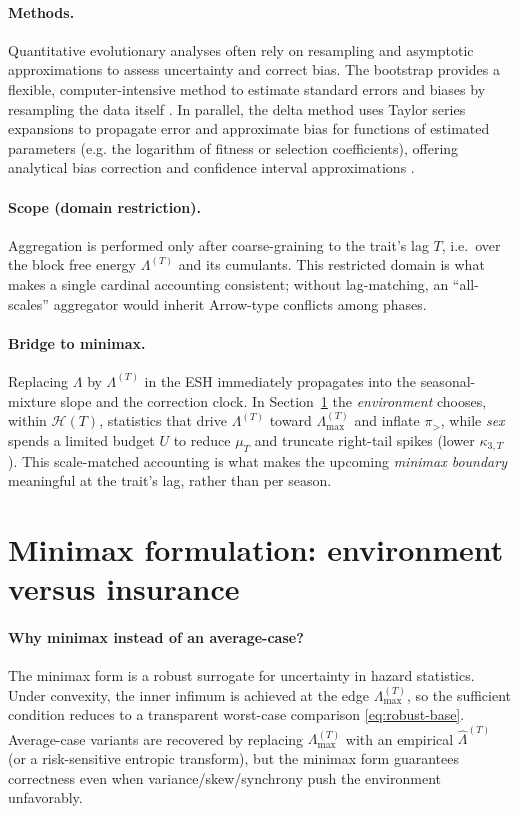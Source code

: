 \documentclass[11pt]{article}
\theoremstyle{upright}
\newcommand{\hazT}[1]{\Lambda^{(#1)}}          %
\newcommand{\hazmaxT}[1]{\Lambda^{(#1)}_{\max}}%
\begin{document}
\paragraph{Methods.}
Quantitative evolutionary analyses often rely on resampling and asymptotic approximations to assess uncertainty and correct bias. The bootstrap provides a flexible, computer-intensive method to estimate standard errors and biases by resampling the data itself \citep{Efron1979}. In parallel, the delta method uses Taylor series expansions to propagate error and approximate bias for functions of estimated parameters (e.g. the logarithm of fitness or selection coefficients), offering analytical bias correction and confidence interval approximations \citep{Casella2002}.

\paragraph{Scope (domain restriction).}
Aggregation is performed only after coarse-graining to the trait’s lag $T$, i.e.\ over the
block free energy $\hazT{T}$ and its cumulants. This restricted domain is what makes a
single cardinal accounting consistent; without lag-matching, an “all-scales” aggregator would
inherit Arrow-type conflicts among phases.

\paragraph{Bridge to minimax.}
Replacing $\Lambda$ by $\hazT{T}$ in the ESH immediately propagates into the seasonal-mixture slope and the correction clock. In Section~\ref{sec:minimax} the \emph{environment} chooses, within $\mathcal H(T)$, statistics that drive $\hazT{T}$ toward $\hazT{T}_{\max}$ and inflate $\pi_{>}$, while \emph{sex} spends a limited budget $U$ to reduce $\mu_T$ and truncate right-tail spikes (lower $\kappa_{3,T}$). This scale-matched accounting is what makes the upcoming \emph{minimax boundary}  meaningful at the trait’s lag, rather than per season.

\section{Minimax formulation: environment versus insurance}
\label{sec:minimax}

\paragraph{Why minimax instead of an average-case?}
The minimax form is a robust surrogate for uncertainty in hazard statistics. Under convexity, the inner infimum is achieved at the edge $\hazmaxT{T}$, so the sufficient condition reduces to a transparent worst-case comparison \eqref{eq:robust-base}. Average-case variants are recovered by replacing $\hazmaxT{T}$ with an empirical $\widehat{\Lambda}^{(T)}$ (or a risk-sensitive entropic transform), but the minimax form guarantees correctness even when variance/skew/synchrony push the environment unfavorably.
\end{document}
